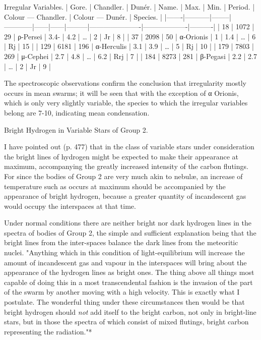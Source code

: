\documentclass[a4paper, 12pt, oneside, polutonikogreek, english]{article}
\begin{document}
Irregular Variables. 
| Gore. | Chandler. | Dunér. | Name.   | Max. | Min. | Period. | Colour --- Chandler. | Colour --- Dunér. | Species. |
|-------|-----------|--------|------------|------|------|---------|----------------------|-------------------|----------|
| 18  | 1072   | 29   | ρ-Persei  | 3.4- | 4.2 | …    | 2          | Jr        | 8    |
| 37  | 2098   | 50   | α-Orionis | 1  | 1.4 | …    | 6          | Rj        | 15    |
| 129  | 6181   | 196  | α-Herculis | 3.1 | 3.9 | …    | 5          | Rj        | 10    |
| 179  | 7803   | 269  | μ-Cephei  | 2.7 | 4.8 | …    | 6.2         | Rrj        | 7    |
| 184  | 8273   | 281  | β-Pegasi  | 2.2 | 2.7 | …    | 2          | Jr        | 9    |

The spectroscopic observations confirm the conclusion that irregularity mostly occurs in mean swarms; it will be seen that with the exception of α Orionis, which is only very slightly variable, the species to which the irregular variables belong are 7-10, indicating mean condensation.

Bright Hydrogen in Variable Stars of Group 2.

I have pointed out (p. 477) that in the class of variable stars under consideration the bright lines of hydrogen might be expected to make their appearance at maximum, accompanying the greatly increased intensity of the carbon flutings. For since the bodies of Group 2 are very much akin to nebulæ, an increase of temperature such as occurs at maximum should be accompanied by the appearance of bright hydrogen, because a greater quantity of incandescent gas would occupy the interspaces at that time.

Under normal conditions there are neither bright nor dark hydrogen lines in the spectra of bodies of Group 2, the simple and sufficient explanation being that the bright lines from the inter-spaces balance the dark lines from the meteoritic nuclei. "Anything which in this condition of light-equilibrium will increase the amount of incandescent gas and vapour in the interspaces will bring about the appearance of the hydrogen lines as bright ones. The thing above all things most capable of doing this in a most transcendental fashion is the invasion of the part of the swarm by another moving with a high velocity. This is exactly what I postulate. The wonderful thing under these circumstances then would be that bright hydrogen should \emph{not} add itself to the bright carbon, not only in bright-line stars, but in those the spectra of which consist of mixed flutings, bright carbon representing the radiation."*
\end{document}
